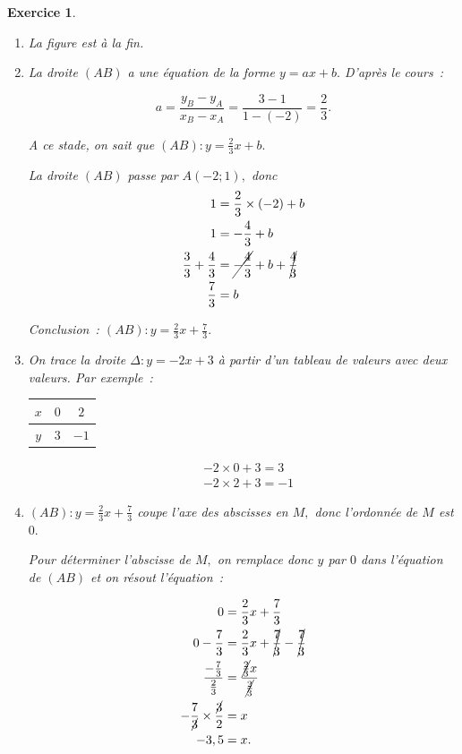 \documentclass[10pt]{article}
\newtheorem{exo}{Exercice}
\begin{document}
\begin{exo}

\begin{enumerate}
\item  La figure est à la fin.
\item La droite $(AB)$ a une équation de la forme $y=ax+b.$ D'après le cours~:

\[a=\frac{y_B-y_A}{x_B-x_A}=\frac{3-1}{1-(-2)}=\frac{2}{3}.\]

A ce stade, on sait que $(AB):y=\frac{2}{3}x+b.$

\medskip

La droite $(AB)$ passe par $A(-2;1),$ donc
\begin{align*}1&=\frac{2}{3}\times (-2)+b\\
1&=-\frac{4}{3}+b\\
\frac{3}{3}+\frac{4}{3}&=\cancel{-\frac{4}{3}}+b+\cancel{\frac{4}{3}}\\
\frac{7}{3}&=b
\end{align*}


Conclusion~: $(AB):y=\frac{2}{3}x+\frac{7}{3}.$


\item On trace la droite $\Delta:y=-2x+3$ à partir d'un tableau de valeurs avec deux valeurs. Par exemple~:

\setlength{\columnseprule}{1pt}

\begin{multicols}{2}
\begin{center}
\begin{tabular}{|c|c|c|}\hline
$x$&$0$&$2$\\ \hline
$y$&$3$&$-1$\\ \hline
\end{tabular}
\end{center}
\columnbreak
\begin{align*}
&-2\times 0+3=3\\
&-2\times 2+3=-1\end{align*}
\end{multicols}
\item $(AB):y=\frac{2}{3}x+\frac{7}{3}$ coupe l'axe des abscisses en $M,$ donc l'ordonnée de $M$ est $0.$

Pour déterminer l'abscisse de $M,$ on remplace donc $y$ par $0$ dans l'équation de $(AB)$ et on résout l'équation~:

\begin{align*}
0&=\frac{2}{3}x+\frac{7}{3}\\
0-\frac{7}{3}&=\frac{2}{3}x+\cancel{\frac{7}{3}}-\cancel{\frac{7}{3}}\\
\frac{-\frac{7}{3}}{\frac{2}{3}}&=\frac{\cancel{\frac{2}{3}}x}{\cancel{\frac{2}{3}}}\\
-\frac{7}{\cancel{3}}\times \frac{\cancel{3}}{2}&=x\\
-3,5&=x.\end{align*}


\end{enumerate}
\end{exo}
\end{document}
